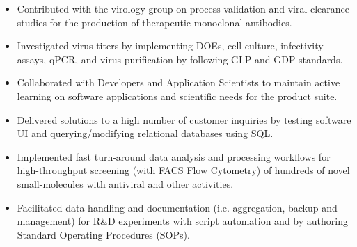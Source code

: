 \documentclass[10pt,a4paper]{altacv}
\begin{document}
\medskip



\begin{itemize}
    \setlength{\itemindent}{0.5em}
    \item   \small{Contributed with the virology group on process validation and viral clearance studies for the production of therapeutic monoclonal antibodies.}
    \setlength{\itemindent}{0.5em}
    \item   \small{Investigated virus titers by implementing DOEs, cell culture, infectivity assays, qPCR, and virus purification by following GLP and GDP standards.}
\end{itemize}

\medskip



\begin{itemize}
    \setlength{\itemindent}{0.5em}
    \item   \small{Collaborated with Developers and Application Scientists to maintain active learning on software applications and scientific needs for the product suite.}
    \setlength{\itemindent}{0.5em}
    \item   \small{Delivered solutions to a high number of customer inquiries by testing software UI and querying/modifying relational databases using SQL.}
\end{itemize}

\medskip




\begin{itemize}
   \setlength{\itemindent}{0.5em}
    \item   \small{Implemented fast turn-around data analysis and processing workflows for high-throughput screening (with FACS Flow Cytometry) of hundreds of novel small-molecules with antiviral and other activities.}
    \setlength{\itemindent}{0.5em}
    \item   \small{Facilitated data handling and documentation (i.e. aggregation, backup and management) for R\&D experiments with script automation and by authoring Standard Operating Procedures (SOPs).}
    
\end{itemize}
\end{document}
